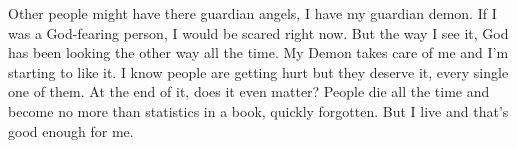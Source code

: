 \documentclass[11pt,letterpaper]{article}
\begin{document}
Other people might have there guardian angels, I have my guardian demon. If I was a God-fearing person, I would be scared right now. But the way I see it, God has been looking the other way all the time. My Demon takes care of me and I'm starting to like it. I know people are getting hurt but they deserve it, every single one of them. At the end of it, does it even matter? People die all the time and become no more than statistics in a book, quickly forgotten. But I live and that's good enough for me.
\end{document}
